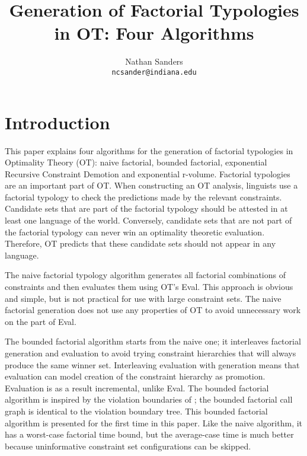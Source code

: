 \documentclass[11pt]{article}
\author{Nathan Sanders \\ \tt{ncsander@indiana.edu}}
\title{Generation of Factorial Typologies in OT: Four Algorithms}
\begin{document}
\maketitle
\section{Introduction}

This paper explains four algorithms for the generation of factorial
typologies in Optimality Theory (OT): naive factorial, bounded factorial,
exponential Recursive Constraint Demotion and exponential
r-volume. Factorial typologies are an important part of OT. When
constructing an OT analysis, linguists use a factorial typology to
check the predictions made by the relevant constraints. Candidate sets
that are part of the factorial typology should be attested in at least
one language of the world.  Conversely, candidate sets that are not
part of the factorial typology can never win an optimality theoretic
evaluation. Therefore, OT predicts that these candidate sets should
not appear in any language.

The naive factorial typology algorithm generates all factorial
combinations of constraints and then evaluates them using OT's {\sc
  Eval}. This approach is obvious and simple, but is not practical for
use with large constraint sets. The naive factorial generation
does not use any properties of OT to avoid unnecessary work on the
part of {\sc Eval}.

The bounded factorial algorithm starts from the naive one; it
interleaves factorial generation and evaluation to avoid trying
constraint hierarchies that will always produce the same winner
set. Interleaving evaluation with generation means that evaluation can
model creation of the constraint hierarchy as promotion. Evaluation is
as a result incremental, unlike {\sc Eval}. The bounded factorial
algorithm is inspired by the violation boundaries of
; the bounded factorial call graph is
identical to the violation boundary tree. This bounded factorial
algorithm is presented for the first time in this paper. Like the
naive algorithm, it has a worst-case factorial time bound, but the
average-case time is much better because uninformative constraint set
configurations can be skipped.
\end{document}

